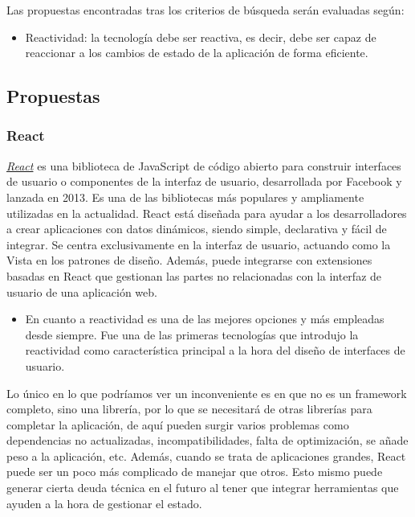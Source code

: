 Las propuestas encontradas tras los criterios de búsqueda serán evaluadas según:

\begin{itemize}
  \item Reactividad: la tecnología debe ser reactiva, es decir, debe ser capaz de reaccionar a los cambios de estado de la aplicación de forma eficiente.
\end{itemize}

\subsection{Propuestas}

\subsubsection{React}

\href{https://react.dev/}{\textit{React}} es una biblioteca de JavaScript de código abierto para construir interfaces de usuario o componentes de la interfaz de usuario, desarrollada por Facebook y lanzada en 2013. Es una de las bibliotecas más populares y ampliamente utilizadas en la actualidad. React está diseñada para ayudar a los desarrolladores a crear aplicaciones con datos dinámicos, siendo simple, declarativa y fácil de integrar. Se centra exclusivamente en la interfaz de usuario, actuando como la Vista en los patrones de diseño. Además, puede integrarse con extensiones basadas en React que gestionan las partes no relacionadas con la interfaz de usuario de una aplicación web. 

\begin{itemize}
  \item[\bien] En cuanto a reactividad es una de las mejores opciones y más empleadas desde siempre. Fue una de las primeras tecnologías que introdujo la reactividad como característica principal a la hora del diseño de interfaces de usuario.
\end{itemize}

Lo único en lo que podríamos ver un inconveniente es en que no es un framework completo, sino una librería, por lo que se necesitará de otras librerías para completar la aplicación, de aquí pueden surgir varios problemas como dependencias no actualizadas, incompatibilidades, falta de optimización, se añade peso a la aplicación, etc. Además, cuando se trata de aplicaciones grandes, React puede ser un poco más complicado de manejar que otros. Esto mismo puede generar cierta deuda técnica en el futuro al tener que integrar herramientas que ayuden a la hora de gestionar el estado.

